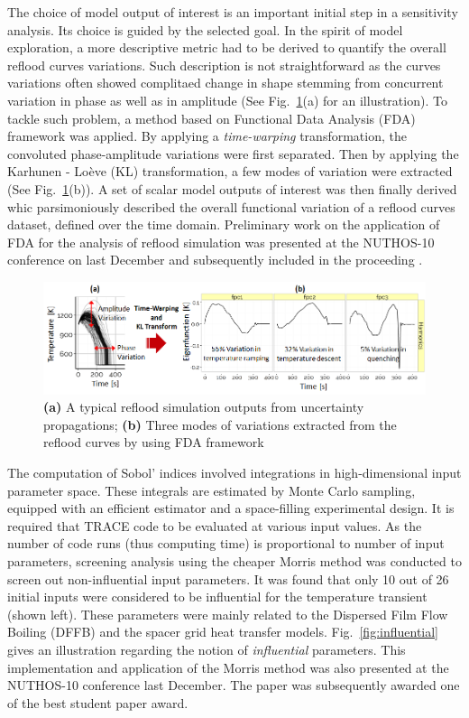 \documentclass[11pt,titlepage]{article}
\begin{document}
The choice of model output of interest is an important initial step in a sensitivity analysis. Its choice is guided by the selected goal.
In the spirit of model exploration, a more descriptive metric had to be derived to quantify the overall reflood curves variations.
Such description is not straightforward as the curves variations often showed complitaed change in shape stemming from concurrent variation in phase as well as in amplitude (See Fig.~\ref{fig:output}(a) for an illustration).
To tackle such problem, a method based on Functional Data Analysis (FDA) framework was applied.
By applying a \emph{time-warping} transformation, the convoluted phase-amplitude variations were first separated. Then by applying the Karhunen - Lo\`eve (KL) transformation, a few modes of variation were extracted (See Fig.~\ref{fig:output}(b)).
A set of scalar model outputs of interest was then finally derived whic parsimoniously described the overall functional variation of a reflood curves dataset, defined over the time domain.
Preliminary work on the application of FDA for the analysis of reflood simulation was presented at the NUTHOS-10 conference on last December and subsequently included in the proceeding \cite{Wicaksono2014a}.

\begin{figure}[h!]
	\centering
		\includegraphics[width=\textwidth]{figures/modelOutputsOfInterest.png}
	\caption{\textbf{(a)} A typical reflood simulation outputs from uncertainty propagations; \textbf{(b)} Three modes of variations extracted from the reflood curves by using FDA framework}
	\label{fig:output}
\end{figure}

The computation of Sobol' indices involved integrations in high-dimensional input parameter space.
These integrals are estimated by Monte Carlo sampling, equipped with an efficient estimator and a space-filling experimental design.
It is required that TRACE code to be evaluated at various input values.
As the number of code runs (thus computing time) is proportional to number of input parameters, screening analysis using the cheaper Morris method was conducted to screen out non-influential input parameters. It was found that only 10 out of 26 initial inputs were considered to be influential for the temperature transient (shown left). 
These parameters were mainly related to the Dispersed Film Flow Boiling (DFFB) and the spacer grid heat transfer models.
Fig.~\ref{fig:influential} gives an illustration regarding the notion of \emph{influential} parameters.
This implementation and application of the Morris method was also presented at the NUTHOS-10 conference last December\cite{Wicaksono2014b}.
The paper was subsequently awarded one of the best student paper award.
\end{document}
